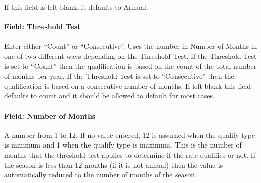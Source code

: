 If this field is left blank, it defaults to Annual.

\paragraph{Field: Threshold Test}\label{field-threshold-test}

Enter either ``Count'' or ``Consecutive''. Uses the number in Number of Months in one of two different ways depending on the Threshold Test. If the Threshold Test is set to ``Count'' then the qualification is based on the count of the total number of months per year. If the Threshold Test is set to ``Consecutive'' then the qualification is based on a consecutive number of months. If left blank this field defaults to count and it should be allowed to default for most cases.

\paragraph{Field: Number of Months}\label{field-number-of-months}

A number from 1 to 12. If no value entered, 12 is assumed when the qualify type is minimum and 1 when the qualify type is maximum. This is the number of months that the threshold test applies to determine if the rate qualifies or not. If the season is less than 12 months (if it is not annual) then the value is automatically reduced to the number of months of the season.
